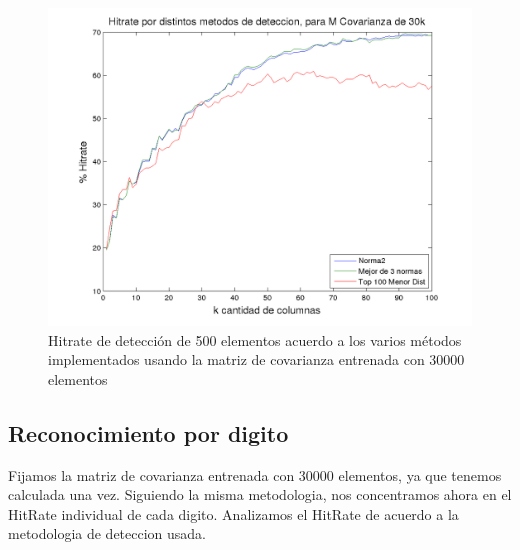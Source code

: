 \begin{figure}[H]
\begin {center}
\includegraphics[width=\hrwidth]{plots/hitrate-30kcv.png}
\end {center}
\caption{Hitrate de detecci\'on de 500 elementos acuerdo a los varios m\'etodos implementados
usando la matriz de covarianza entrenada con 30000 elementos}
\label{fig:HR30kcv}
\end{figure}



\subsection{Reconocimiento por digito}
Fijamos la matriz de covarianza entrenada con 30000 elementos, ya que tenemos calculada una vez.
Siguiendo la misma metodologia, nos concentramos ahora en el HitRate individual
de cada digito. Analizamos el HitRate de acuerdo a la metodologia de deteccion usada.
\def \pdwidth {500pt}

